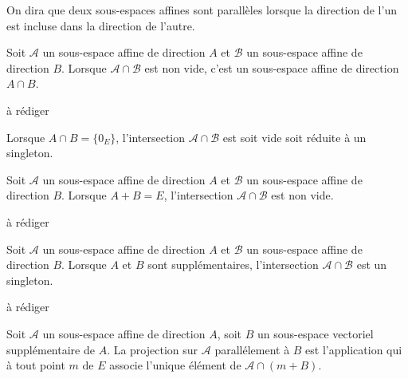 \begin{defi}
 On dira que deux sous-espaces affines sont parallèles lorsque la direction de l'un est incluse dans la direction de l'autre. 
\end{defi}
\begin{prop}
 Soit $\mathcal A$ un sous-espace affine de direction $A$ et $\mathcal B$ un sous-espace affine de direction $B$. Lorsque $\mathcal A\cap \mathcal B$ est non vide, c'est un sous-espace affine de direction $A\cap B$.
\end{prop}
\begin{demo}
 à rédiger
\end{demo}
\begin{rem}
 Lorsque $A\cap B=\{0_E\}$, l'intersection $\mathcal A \cap \mathcal B$ est soit vide soit réduite à un singleton.
\end{rem}
\begin{prop}
 Soit $\mathcal A$ un sous-espace affine de direction $A$ et $\mathcal B$ un sous-espace affine de direction $B$. Lorsque $A+B=E$, l'intersection $\mathcal A\cap \mathcal B$ est non vide.
\end{prop}
% 

\begin{demo}
 à rédiger
\end{demo}
\begin{prop}
 Soit $\mathcal A$ un sous-espace affine de direction $A$ et $\mathcal B$ un sous-espace affine de direction $B$. Lorsque $A$ et $B$ sont supplémentaires, l'intersection $\mathcal A\cap \mathcal B$ est un singleton.
\end{prop}
\begin{demo}
 à rédiger
\end{demo}
\begin{defi}
 Soit $\mathcal A$ un sous-espace affine de direction $A$, soit $B$ un sous-espace vectoriel supplémentaire de $A$. La projection sur $\mathcal A$ parallélement à $B$ est l'application qui à tout point $m$ de $E$ associe l'unique élément de $\mathcal A \cap(m+B)$.
\end{defi}

